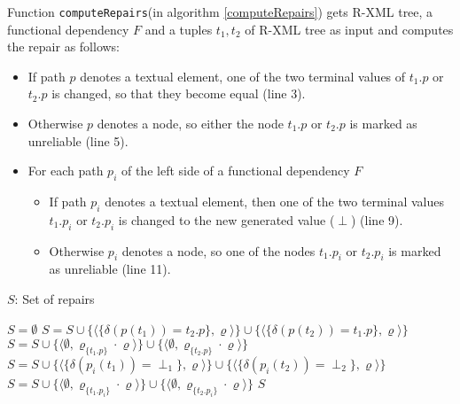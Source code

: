 Function \texttt{computeRepairs}(in algorithm \ref{computeRepairs}) gets R-XML tree, a functional dependency $F$ and a tuples $t_1, t_2$ of R-XML tree as input and computes the repair as follows:
\begin{itemize}
	\item If path $p$ denotes a textual element, one of the two terminal values of $t_1.p$ or $t_2.p$ is changed, so that they become equal (line 3).
	\item Otherwise $p$ denotes a node, so either the node $t_1.p$ or $t_2.p$ is marked as unreliable (line 5).
	\item For each path $p_i$ of the left side of a functional dependency $F$
	\begin{itemize}
		\item If path $p_i$ denotes a textual element, then one of the two terminal values $t_1.p_i$ or $t_2.p_i$ is changed to the new generated value ($\perp$) (line 9).
		\item Otherwise $p_i$ denotes a node, so one of the nodes $t_1.p_i$ or $t_2.p_i$ is marked as unreliable (line 11).
	\end{itemize}
\end{itemize}

\begin{algorithm}[H]
\caption{$computeRepairs(F, t_1, t_2, RXT)$}
\begin{algorithmic}[1]\label{computeRepairs}
\ENSURE $S$: Set of repairs

\STATE $S = \emptyset$
	\STATE $S = S \cup \{\langle \{\delta(p(t_1)) = t_2.p\}, \varrho \rangle\} \cup \{\langle \{\delta(p(t_2)) = t_1.p\}, \varrho \rangle\} $
\ELSE
	\STATE $S = S \cup \{\langle \emptyset, \varrho_{\{t_1.p\}} \cdot \varrho \rangle\} \cup \{\langle \emptyset, \varrho_{\{t_2.p\}} \cdot \varrho \rangle\}$
\ENDIF
{}
		\STATE $S = S \cup \{\langle \{\delta(p_i(t_1)) = \perp_1\}, \varrho \rangle\} \cup \{\langle \{\delta(p_i(t_2)) = \perp_2\}, \varrho \rangle\}$
	\ELSE
		\STATE $S = S \cup \{\langle \emptyset, \varrho_{\{t_1.p_i\}} \cdot \varrho \rangle\} \cup \{\langle \emptyset, \varrho_{\{t_2.p_i\}} \cdot \varrho \rangle\}$
	\ENDIF
\ENDFOR
\RETURN $S$
\end{algorithmic}
\end{algorithm}

